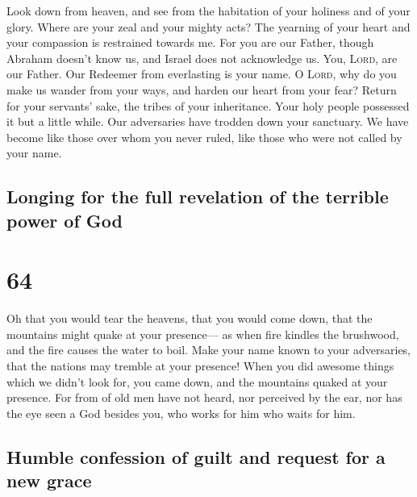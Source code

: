  Look down from heaven, and see from the habitation of
your holiness and of your glory. Where are your zeal and your mighty
acts? The yearning of your heart and your compassion is restrained
towards me.  For you are our Father, though Abraham
doesn't know us, and Israel does not acknowledge us. You, \textsc{Lord},
are our Father. Our Redeemer from everlasting is your name.
 O \textsc{Lord}, why do you make us wander from your
ways, and harden our heart from your fear? Return for your servants'
sake, the tribes of your inheritance.  Your holy people
possessed it but a little while. Our adversaries have trodden down your
sanctuary.  We have become like those over whom you never
ruled, like those who were not called by your name.

\hypertarget{longing-for-the-full-revelation-of-the-terrible-power-of-god}{%
\subsection{Longing for the full revelation of the terrible power of
God}\label{longing-for-the-full-revelation-of-the-terrible-power-of-god}}

\hypertarget{section-63}{%
\section{64}\label{section-63}}

 Oh that you would tear the heavens, that you would come
down, that the mountains might quake at your presence--- 
as when fire kindles the brushwood, and the fire causes the water to
boil. Make your name known to your adversaries, that the nations may
tremble at your presence!  When you did awesome things
which we didn't look for, you came down, and the mountains quaked at
your presence.  For from of old men have not heard, nor
perceived by the ear, nor has the eye seen a God besides you, who works
for him who waits for him.

\hypertarget{humble-confession-of-guilt-and-request-for-a-new-grace}{%
\subsection{Humble confession of guilt and request for a new
grace}\label{humble-confession-of-guilt-and-request-for-a-new-grace}}

